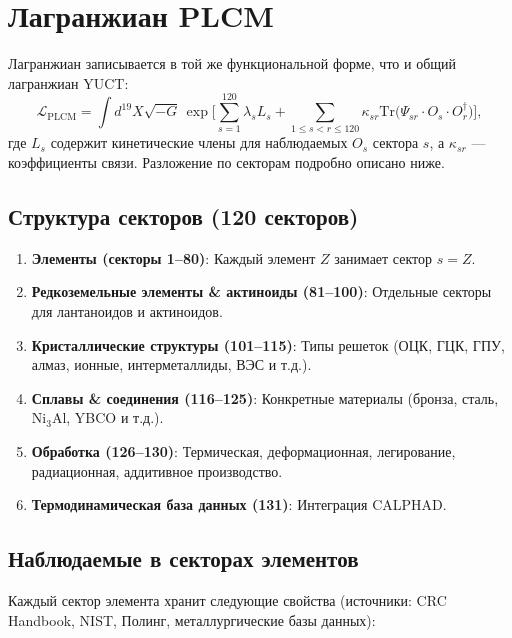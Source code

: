 \documentclass[12pt,a4paper]{article}
\begin{document}
	\section{Лагранжиан PLCM}
	
	Лагранжиан записывается в той же функциональной форме, что и общий лагранжиан YUCT:
	\[
	\mathcal{L}_{\text{PLCM}} = \int d^{19}X \sqrt{-G} \,
	\exp\Bigg[ \sum_{s=1}^{120} \lambda_s L_s + \sum_{1\le s<r\le 120} \kappa_{sr} \mathrm{Tr}\big(\Psi_{sr} \cdot O_s \cdot O_r^\dagger\big) \Bigg],
	\]
	где \(L_s\) содержит кинетические члены для наблюдаемых \(O_s\) сектора \(s\), а \(\kappa_{sr}\) — коэффициенты связи. Разложение по секторам подробно описано ниже.
	
	\subsection{Структура секторов (120 секторов)}
	
	\begin{enumerate}
		\item \textbf{Элементы (секторы 1–80)}: Каждый элемент \(Z\) занимает сектор \(s=Z\).
		\item \textbf{Редкоземельные элементы \& актиноиды (81–100)}: Отдельные секторы для лантаноидов и актиноидов.
		\item \textbf{Кристаллические структуры (101–115)}: Типы решеток (ОЦК, ГЦК, ГПУ, алмаз, ионные, интерметаллиды, ВЭС и т.д.).
		\item \textbf{Сплавы \& соединения (116–125)}: Конкретные материалы (бронза, сталь, Ni\(_{3}\)Al, YBCO и т.д.).
		\item \textbf{Обработка (126–130)}: Термическая, деформационная, легирование, радиационная, аддитивное производство.
		\item \textbf{Термодинамическая база данных (131)}: Интеграция CALPHAD.
	\end{enumerate}
	
	\subsection{Наблюдаемые в секторах элементов}
	
	Каждый сектор элемента хранит следующие свойства (источники: CRC Handbook, NIST, Полинг, металлургические базы данных):
	
\end{document}
